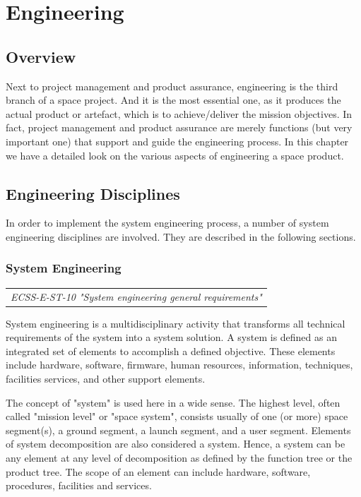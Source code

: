 \chapter{Engineering}

\section{Overview}

Next to project management and product assurance, engineering is the third branch of a space project. And it is the most essential one, as it produces the actual product or artefact, which is to achieve/deliver the mission objectives. In fact, project management and product assurance are merely functions (but very important one) that support and guide the engineering process. In this chapter we have a detailed look on the various aspects of engineering a space product.

\section{Engineering Disciplines}

In order to implement the system engineering process, a number of system engineering disciplines are involved. They are described in the following sections.

\subsection{System Engineering}
\label{sec:System Engineering}

\begin{tabular}{l}
\textit{ECSS-E-ST-10 "System engineering general requirements" \cite{ECSS-E-ST-10}}
\end{tabular}

System engineering is a multidisciplinary activity that transforms all technical requirements of the system into a system solution. A system is defined as an integrated set of elements to accomplish a defined objective. These elements include hardware, software, firmware, human resources, information, techniques, facilities services, and other support elements.

The concept of "system" is used here in a wide sense. The highest level, often called "mission level" or "space system", consists usually of one (or more) space segment(s), a ground segment, a launch segment, and a user segment. Elements of system decomposition are also considered a system. Hence, a system can be any element at any level of decomposition as defined by the function tree or the product tree. The scope of an element can include hardware, software, procedures, facilities and services.

